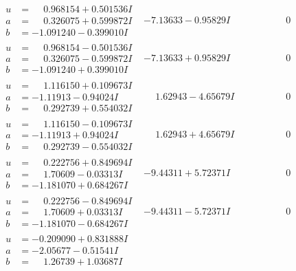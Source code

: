 \documentclass[1p]{elsarticle_modified}
\theoremstyle{definition}
\begin{document}
$$\begin{array}{c|c|c}
\begin{aligned}
u &= \phantom{-}0.968154 + 0.501536 I \\
a &= \phantom{-}0.326075 + 0.599872 I \\
b &= -1.091240 - 0.399010 I\end{aligned}
 & -7.13633 - 0.95829 I & \phantom{-0.000000 } 0 \\ \hline\begin{aligned}
u &= \phantom{-}0.968154 - 0.501536 I \\
a &= \phantom{-}0.326075 - 0.599872 I \\
b &= -1.091240 + 0.399010 I\end{aligned}
 & -7.13633 + 0.95829 I & \phantom{-0.000000 } 0 \\ \hline\begin{aligned}
u &= \phantom{-}1.116150 + 0.109673 I \\
a &= -1.11913 - 0.94024 I \\
b &= \phantom{-}0.292739 + 0.554032 I\end{aligned}
 & \phantom{-}1.62943 - 4.65679 I & \phantom{-0.000000 } 0 \\ \hline\begin{aligned}
u &= \phantom{-}1.116150 - 0.109673 I \\
a &= -1.11913 + 0.94024 I \\
b &= \phantom{-}0.292739 - 0.554032 I\end{aligned}
 & \phantom{-}1.62943 + 4.65679 I & \phantom{-0.000000 } 0 \\ \hline\begin{aligned}
u &= \phantom{-}0.222756 + 0.849694 I \\
a &= \phantom{-}1.70609 - 0.03313 I \\
b &= -1.181070 + 0.684267 I\end{aligned}
 & -9.44311 + 5.72371 I & \phantom{-0.000000 } 0 \\ \hline\begin{aligned}
u &= \phantom{-}0.222756 - 0.849694 I \\
a &= \phantom{-}1.70609 + 0.03313 I \\
b &= -1.181070 - 0.684267 I\end{aligned}
 & -9.44311 - 5.72371 I & \phantom{-0.000000 } 0 \\ \hline\begin{aligned}
u &= -0.209090 + 0.831888 I \\
a &= -2.05677 - 0.51541 I \\
b &= \phantom{-}1.26739 + 1.03687 I\end{aligned}

\end{array}$$
\end{document}
